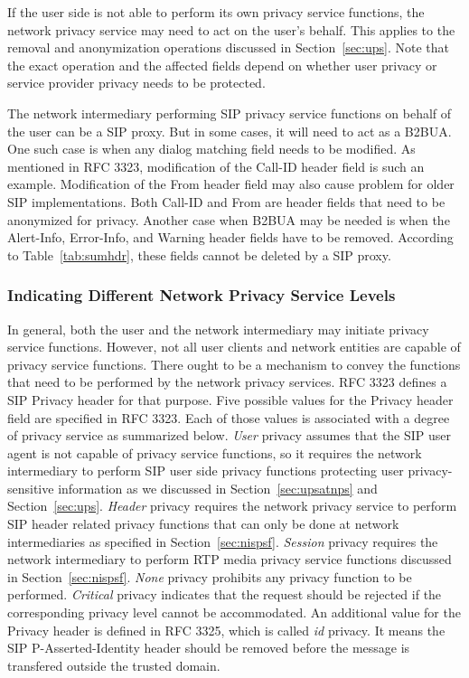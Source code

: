 \documentclass[letterpaper,notitlepage,times,12pt]{article}
\begin{document}
If the user side is not able to perform its own privacy service functions, the network privacy service may need to act on the user's behalf. This applies to the removal and anonymization operations discussed in Section~\ref{sec:ups}. Note that the exact operation and the affected fields depend on whether user privacy or service provider privacy needs to be protected.

The network intermediary performing SIP privacy service functions on behalf of the user can be a SIP proxy. But in some cases, it will need to act as a B2BUA. One such case is when any dialog matching field needs to be modified. As mentioned in RFC 3323, modification of the {\sf Call-ID} header field is such an example. Modification of the {\sf From} header field may also cause problem for older SIP implementations. Both {\sf Call-ID} and {\sf From} are header fields that need to be anonymized for privacy. Another case when B2BUA may be needed is when the {\sf Alert-Info}, {\sf Error-Info}, and {\sf Warning} header fields have to be removed. According to Table~\ref{tab:sumhdr}, these fields cannot be deleted by a SIP proxy.
\subsubsection{Indicating Different Network Privacy Service Levels} \label{sec:reqnps}

In general, both the user and the network intermediary may initiate privacy service functions. However, not all user clients and network entities are capable of privacy service functions. There ought to be a mechanism to convey the functions that need to be performed by the network privacy services. RFC 3323 defines a SIP {\sf Privacy} header for that purpose. Five possible values for the {\sf Privacy} header field are specified in RFC 3323. Each of those values is associated with a degree of privacy service as summarized below. {\it User} privacy assumes that the SIP user agent is not capable of privacy service functions, so it requires the network intermediary to perform SIP user side privacy functions protecting user privacy-sensitive information as we discussed in Section~\ref{sec:upsatnps} and Section~\ref{sec:ups}. {\it Header} privacy requires the network privacy service to perform SIP header related privacy functions that can only be done at network intermediaries as specified in Section~\ref{sec:nispsf}. {\it Session} privacy requires the network intermediary to perform RTP media privacy service functions discussed in Section~\ref{sec:nispsf}. {\it None} privacy prohibits any privacy function to be performed. {\it Critical} privacy indicates that the request should be rejected if the corresponding privacy level cannot be accommodated. An additional value for the {\sf Privacy} header is defined in RFC 3325, which is called {\it id} privacy. It means the SIP {\sf P-Asserted-Identity} header should be removed before the message is transfered outside the trusted domain.
\end{document}
